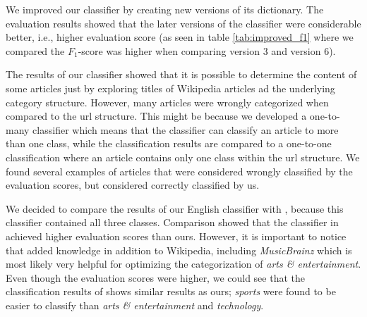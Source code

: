 We improved our classifier by creating new versions of its dictionary. The evaluation results showed that the later versions of the classifier were considerable better, i.e., higher evaluation score (as seen in table  \ref{tab:improved_f1} where we compared the $F_{1}$-score was higher when comparing version 3 and version 6). %



The results of our classifier showed that it is possible to determine the content of some articles just by exploring titles of Wikipedia articles ad the underlying category structure. However, many articles were wrongly categorized when compared to the url structure. This might be because we developed a one-to-many classifier which means that the classifier can classify an article to more than one class, while the classification results are compared to a one-to-one classification where an article contains only one class within the url structure. We found several examples of articles that were considered wrongly classified by the evaluation scores, but considered correctly classified by us. 




We decided to compare the results of our English classifier with \cite{entityextraction}, because this classifier contained all three classes.  Comparison showed that the classifier in \cite{entityextraction} achieved higher evaluation scores than ours. However, it is important to notice that \cite{entityextraction} added knowledge in addition to Wikipedia, including \emph{MusicBrainz} which is most likely very helpful for optimizing the categorization of \emph{arts \& entertainment}. Even though the evaluation scores were higher, we could see that the classification results of \cite{entityextraction} shows similar results as ours; \emph{sports} were found to be easier to classify than \emph{arts \& entertainment} and \emph{technology}.


\begin{comment}
ir classifier had the same 
, where we can see that th

sports: 0.317558
arts: 0.159681
0.163934

Difference between 

\begin{table}[]
\centering
\renewcommand{\arraystretch}{1.25}
\begin{tabular}{|c}
 &  \\
 & 
\end{tabular}
\caption{Caption}
\label{tab:my_label}
\end{table}

\end{comment}

